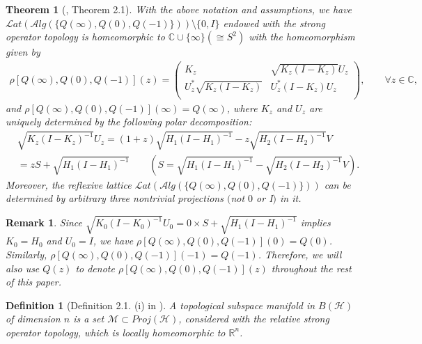 \documentclass[a4paper,10pt]{amsart}
\newtheorem{theorem}{Theorem}[section]
\newtheorem{definition}{Definition}[section]
\newtheorem{remark}{Remark}[section]
\newcommand{\HHH}{\mathcal H} %
\newcommand{\Lat}{\mathcal Lat}
\newcommand{\Alg}{\mathcal Alg}
\newcommand{\C}{\mathbb C} %
\newcommand{\R}{\mathbb R}  %
\begin{document}
\begin{theorem}[\cite{Hou}, Theorem 2.1] \label{1thm1}
With the above notation and assumptions, we have 
$\Lat(\Alg(\{Q(\infty), Q(0), Q(-1)\})) \setminus \{0, I\}$ 
endowed with the strong operator topology
is homeomorphic to $\C \cup \{\infty\} (\cong S^2)$ with
the homeomorphism given by
\begin{align*}
    \rho[Q(\infty), Q(0), Q(-1)](z) = \left(
     \begin{array}{cc}
      K_{z} & \sqrt{K_{z}(I-K_{z})}U_{z} \\
      U_{z}^{*}\sqrt{K_{z}(I-K_{z})} & U_{z}^{*}(I-K_{z})U_{z} \\
  \end{array}
\right) , \qquad \forall z \in \C,
\end{align*}
and $\rho[Q(\infty), Q(0), Q(-1)](\infty) 
= Q(\infty)$, 
where $K_z$ and $U_z$ are uniquely determined by the following polar decomposition:
\begin{equation}\label{eq1}
\begin{split}
&\sqrt{K_{z}(I-K_{z})^{-1}}U_{z} = (1+z)\sqrt{H_{1}(I-H_{1})^{-1}}-
                                   z\sqrt{H_{2}(I-H_{2})^{-1}}V \\
                                 &=zS + \sqrt{H_{1}(I-H_{1})^{-1}} \qquad 
                                   (S = \sqrt{H_{1}(I-H_{1})^{-1}}- 
                                   \sqrt{H_{2}(I-H_{2})^{-1}}V) .
\end{split}
\end{equation}
Moreover,  the reflexive lattice 
$\Lat(\Alg(\{Q(\infty), Q(0), Q(-1)\}))$ 
can be determined by arbitrary three nontrivial projections
$($not $0$ or I$)$ in it.
\end{theorem}

\begin{remark}\label{1re1}
Since $\sqrt{K_{0}(I-K_{0})^{-1}}U_{0} =
0\times S + \sqrt{H_{1}(I-H_{1})^{-1}}$ implies $K_{0} = H_{0}$ 
and $U_{0} = I$, 
we have $\rho[Q(\infty), Q(0), Q(-1)](0) = Q(0)$. Similarly, 
$\rho[Q(\infty), Q(0), Q(-1)](-1) = Q(-1)$. Therefore, we will also use 
$Q(z)$ to denote $\rho[Q(\infty), Q(0), Q(-1)](z)$ throughout the 
rest of this paper.
\end{remark}

\begin{definition}[Definition 2.1. (i) in \cite{LP}]\label{1exm1}
    A topological subspace manifold in $B(\HHH)$ of dimension $n$ is a set
    $\mathcal{M} \subset Proj(\HHH)$, considered with the relative strong 
    operator topology, which is locally homeomorphic to $\R^{n}$.
\end{definition}
\end{document}
